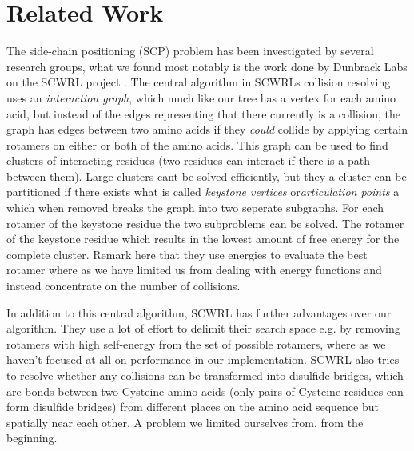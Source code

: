 
\section{Related Work}
The side-chain positioning (SCP) problem has been investigated by
several research groups, what we found most notably is the work done
by Dunbrack Labs on the SCWRL project \cite{canutescu2003graph,
  krivov2009improved}. The central algorithm in SCWRLs collision
resolving uses an \textit{interaction graph}, which much like our tree
has a vertex for each amino acid, but instead of the edges
representing that there currently is a collision, the graph has edges
between two amino acids if they \textit{could} collide by applying
certain rotamers on either or both of the amino acids. This graph can
be used to find clusters of interacting residues (two residues can
interact if there is a path between them). Large clusters cant be
solved efficiently, but they a cluster can be partitioned if there
exists what is called \textit{keystone vertices}
or\textit{articulation points} a which when removed breaks the graph
into two seperate subgraphs. For each rotamer of the keystone residue
the two subproblems can be solved. The rotamer of the keystone residue
which results in the lowest amount of free energy for the complete
cluster. Remark here that they use energies to evaluate the best
rotamer where as we have limited us from dealing with energy functions
and instead concentrate on the number of collisions.

In addition to this central algorithm, SCWRL has further advantages
over our algorithm. They use a lot of effort to delimit their search
space e.g. by removing rotamers with high self-energy from the set of
possible rotamers, where as we haven't focused at all on performance
in our implementation. SCWRL also tries to resolve whether any
collisions can be transformed into disulfide bridges, which are bonds
between two Cysteine amino acids (only pairs of Cysteine residues can
form disulfide bridges) from different places on the amino acid
sequence but spatially near each other. A problem we limited ourselves
from, from the beginning.

